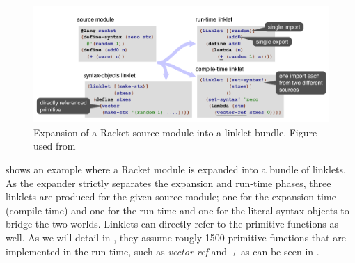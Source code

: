 \begin{figure}[h]
  \centering
  \includegraphics[scale=0.3]{img/racket-expand-example}
  \caption{Expansion of a Racket source module into a linklet
    bundle. Figure used from \cite{racket-on-chez-19}}
  \label{fig:racket-expand-example}
\end{figure}

 shows an example where a Racket
module is expanded into a bundle of linklets. As the expander strictly
separates the expansion and run-time phases, three linklets are
produced for the given source module; one for the expansion-time
(compile-time) and one for the run-time and one for the literal syntax
objects to bridge the two worlds. Linklets can directly refer to the
primitive functions as well. As we will detail in
, they assume rougly 1500 primitive functions
that are implemented in the run-time, such as \emph{vector-ref} and
\emph{+} as can be seen in .

